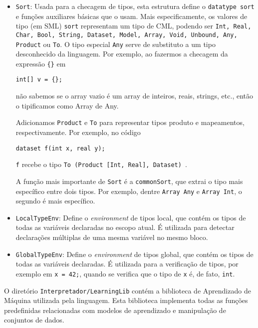 \documentclass[12pt]{article}
\begin{document}
\begin{enumerate}
\begin{itemize}
\item \texttt{Sort}: Usada para a checagem de tipos, esta estrutura define o \texttt{datatype sort} e funções auxiliares básicas que o usam. Mais especificamente, os valores de tipo (em SML) \texttt{sort} representam um tipo de CML, podendo ser \texttt{Int, Real, Char, Bool, String, Dataset, Model, Array, Void, Unbound, Any, Product} ou \texttt{To}. O tipo especial \texttt{Any} serve de substituto a um tipo desconhecido da linguagem. Por exemplo, ao fazermos a checagem da expressão \texttt{\{\}} em

\begin{Verbatim}
int[] v = {};
\end{Verbatim}

não sabemos se o array vazio é um array de inteiros, reais, strings, etc., então o tipificamos como Array de Any.

Adicionamos \texttt{Product} e \texttt{To} para representar tipos produto e mapeamentos, respectivamente. Por exemplo, no código

\begin{Verbatim}
dataset f(int x, real y);
\end{Verbatim}

\texttt{f} recebe o tipo \texttt{To (Product [Int, Real], Dataset) }.

A função mais importante de \texttt{Sort} é a \texttt{commonSort}, que extrai o tipo mais específico entre dois tipos. Por exemplo, dentre \texttt{Array Any} e \texttt{Array Int}, o segundo é mais específico.

\item \texttt{LocalTypeEnv}: Define o \textit{environment} de tipos local, que contém os tipos de todas as variáveis declaradas no escopo atual. É utilizada para detectar declarações múltiplas de uma mesma variável no mesmo bloco.

\item \texttt{GlobalTypeEnv}: Define o \textit{environment} de tipos global, que contém os tipos de todas as variáveis declaradas. É utilizada para a verificação de tipos, por exemplo em \texttt{x = 42;}, quando se verifica que o tipo de \texttt{x} é, de fato, \texttt{int}.
\end{itemize}
\end{enumerate}

O diretório \texttt{Interpretador/LearningLib} contém a biblioteca de Aprendizado de Máquina utilizada pela linguagem. Esta biblioteca implementa todas as funções predefinidas relacionadas com modelos de aprendizado e manipulação de conjuntos de dados.
\end{document}
